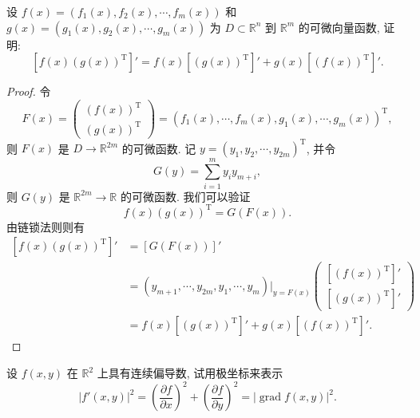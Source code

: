 \documentclass[12pt,fontset=fandol]{ctexart}
\begin{document}
\begin{example}\label{course-example-14-2-4}\quad 设 $f(x)=(f_1(x),f_2(x),\cdots,f_m(x))$ 和 $g(x)=(g_1(x),g_2(x),\cdots,g_m(x))$ 为 $D\subset\mathbb R^n$ 到 $\mathbb R^m$ 的可微向量函数, 证明:
\[
  [f(x)(g(x))^\mathrm T]'=f(x)[(g(x))^\mathrm T]'+g(x)[(f(x))^\mathrm T]'.
\]

\end{example}
\begin{proof}\quad 令
\[
  F(x)=
  \begin{pmatrix}
    (f(x))^\mathrm T\\
    (g(x))^\mathrm T
  \end{pmatrix}
  =(f_1(x),\cdots,f_m(x),g_1(x),\cdots,g_m(x))^\mathrm T,
\]
则 $F(x)$ 是 $D\to\mathbb R^{2m}$ 的可微函数. 记 $y=(y_1,y_2,\cdots,y_{2m})^\mathrm T$, 并令
\[
  G(y)=\sum_{i=1}^m y_i y_{m+i},
\]
则 $G(y)$ 是 $\mathbb R^{2m}\to\mathbb R$ 的可微函数. 我们可以验证
\[
  f(x)(g(x))^\mathrm T=G(F(x)).
\]
由链锁法则则有
\[
\begin{aligned}
  [f(x)(g(x))^\mathrm T]'
  &=[G(F(x))]'\\
  &=(y_{m+1},\cdots,y_{2m},y_1,\cdots,y_m)\big|_{y=F(x)}
  \begin{pmatrix}
    [(f(x))^\mathrm T]'\\
    [(g(x))^\mathrm T]'
  \end{pmatrix}\\
  &=f(x)[(g(x))^\mathrm T]'+g(x)[(f(x))^\mathrm T]'.
\end{aligned}
\]

\end{proof}
\begin{example}\label{course-example-14-2-5}\quad 设 $f(x,y)$ 在 $\mathbb R^2$ 上具有连续偏导数, 试用极坐标来表示
\[
  |f'(x,y)|^2=
  \left(\frac{\partial f}{\partial x}\right)^2+
  \left(\frac{\partial f}{\partial y}\right)^2
  =|\operatorname{grad}f(x,y)|^2.
\]

\end{example}
\end{document}
